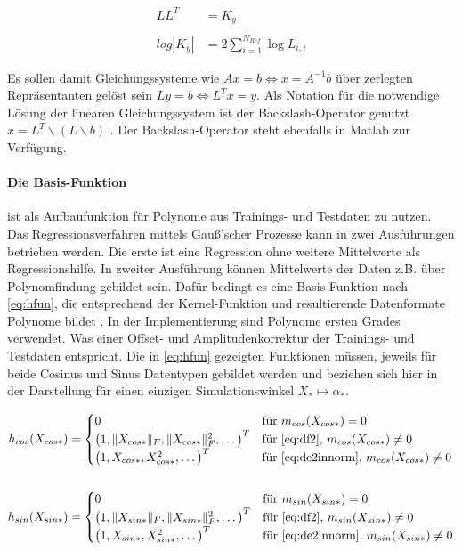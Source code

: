 \begin{align}\label{eq:chol}
		 LL^T &= K_y  \nonumber \\
		 \\
	log |K_y| &= 2 \sum_{i=1}^{N_{Ref}} \log L_{i,i} \nonumber
\end{align}


Es sollen damit Gleichungssysteme wie $Ax = b \Leftrightarrow x = A^{-1}b$ über zerlegten Repräsentanten gelöst sein $Ly = b \Leftrightarrow L^Tx = y$. Als Notation für die notwendige Lösung der linearen Gleichungssystem ist der Backslash-Operator genutzt $x = L^T \backslash (L \backslash b)$ \cite{Rasmussen2006}. Der Backslash-Operator steht ebenfalls in Matlab zur Verfügung.


\paragraph*{Die Basis-Funktion} ist als Aufbaufunktion für Polynome aus Trainings- und Testdaten zu nutzen. Das Regressionsverfahren mittels Gauß'scher Prozesse kann in zwei Ausführungen betrieben werden. Die erste ist eine Regression ohne weitere Mittelwerte als Regressionshilfe. In zweiter Ausführung können Mittelwerte der Daten z.B. über Polynomfindung gebildet sein. Dafür bedingt es eine Basis-Funktion nach \autoref{eq:hfun}, die entsprechend der Kernel-Funktion und resultierende Datenformate Polynome bildet \cite{Rasmussen2006}. In der Implementierung sind Polynome ersten Grades verwendet. Was einer Offset- und Amplitudenkorrektur der Trainings- und Testdaten entspricht. Die in \autoref{eq:hfun} gezeigten Funktionen müssen, jeweils für beide Cosinus und Sinus Datentypen gebildet werden und beziehen sich hier in der Darstellung für einen einzigen Simulationswinkel $X_* \mapsto \alpha_*$.


\begin{align}\label{eq:hfun}
	h_{cos}(X_{cos*}) &=
		\begin{cases}
			0								                          & \text{für } m_{cos}(X_{cos*}) = 0 \\
			\big( 1, \|X_{cos*}\|_F, \|X_{cos*}\|_F^2, \ldots \big)^T & \text{für \autoref{eq:df2}, }       m_{cos}(X_{cos*}) \ne 0 \\
			\big( 1, X_{cos*}, X_{cos*}^2, \ldots \big)^T             & \text{für \autoref{eq:de2innorm}, } m_{cos}(X_{cos*}) \ne 0
		\end{cases} \nonumber \\
	\\
	h_{sin}(X_{sin*}) &=
		\begin{cases}
			0								                          & \text{für } m_{sin}(X_{sin*}) = 0 \\
			\big( 1, \|X_{sin*}\|_F, \|X_{sin*}\|_F^2, \ldots \big)^T & \text{für \autoref{eq:df2}, }       m_{sin}(X_{sin*}) \ne 0 \\
			\big( 1, X_{sin*}, X_{sin*}^2, \ldots \big)^T             & \text{für \autoref{eq:de2innorm}, } m_{sin}(X_{sin*}) \ne 0
		\end{cases} \nonumber
\end{align}


